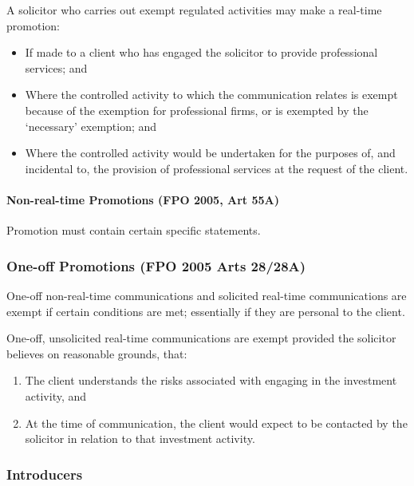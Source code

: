 \documentclass[
]{article}
\providecommand{\tightlist}{%
  \setlength{\itemsep}{0pt}\setlength{\parskip}{0pt}}
\begin{document}
A solicitor who carries out exempt regulated activities may make a
real-time promotion:

\begin{itemize}
\tightlist
\item
  If made to a client who has engaged the solicitor to provide
  professional services; and
\item
  Where the controlled activity to which the communication relates is
  exempt because of the exemption for professional firms, or is exempted
  by the `necessary' exemption; and
\item
  Where the controlled activity would be undertaken for the purposes of,
  and incidental to, the provision of professional services at the
  request of the client.
\end{itemize}

\hypertarget{non-real-time-promotions-fpo-2005-art-55a}{%
\paragraph{Non-real-time Promotions (FPO 2005, Art
55A)}\label{non-real-time-promotions-fpo-2005-art-55a}}

Promotion must contain certain specific statements.

\hypertarget{one-off-promotions-fpo-2005-arts-2828a}{%
\subsubsection{One-off Promotions (FPO 2005 Arts
28/28A)}\label{one-off-promotions-fpo-2005-arts-2828a}}

One-off non-real-time communications and solicited real-time
communications are exempt if certain conditions are met; essentially if
they are personal to the client.

One-off, unsolicited real-time communications are exempt provided the
solicitor believes on reasonable grounds, that:

\begin{enumerate}
\def\labelenumi{\arabic{enumi}.}
\tightlist
\item
  The client understands the risks associated with engaging in the
  investment activity, and
\item
  At the time of communication, the client would expect to be contacted
  by the solicitor in relation to that investment activity.
\end{enumerate}

\hypertarget{introducers}{%
\subsubsection{Introducers}\label{introducers}}
\end{document}
